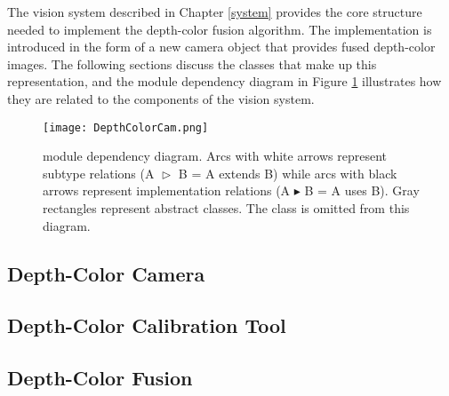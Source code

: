 The vision system described in Chapter \ref{system} provides the core structure needed to implement the 
depth-color fusion algorithm. The implementation is introduced in the form of a new camera object that 
provides fused depth-color images. The following sections discuss the classes that make up this 
representation, and the module dependency diagram in Figure \ref{depthcolorcammoduledependency} 
illustrates how they are related to the components of the vision system.

\begin{figure}[t]
\begin{center}
\texttt{[image: DepthColorCam.png]}
%
\caption[\DepthColorCam{}'s module dependency diagram]{\DepthColorCam{} module dependency diagram. 
Arcs with white arrows represent subtype relations (A $\vartriangleright$ B = A extends B) while arcs with 
black arrows represent implementation relations (A $\blacktriangleright$ B = A uses B). Gray rectangles 
represent abstract classes. The \ImageBuffer{} class is omitted from this diagram.}
\label{depthcolorcammoduledependency}
\end{center}
\end{figure}

	\subsection{Depth-Color Camera} \label{depthcolorcam}
	
	
	\subsection{Depth-Color Calibration Tool} \label{depthcolorcalibrationtool}
	
	
	\subsection{Depth-Color Fusion} \label{depthcolorfusion}
	



